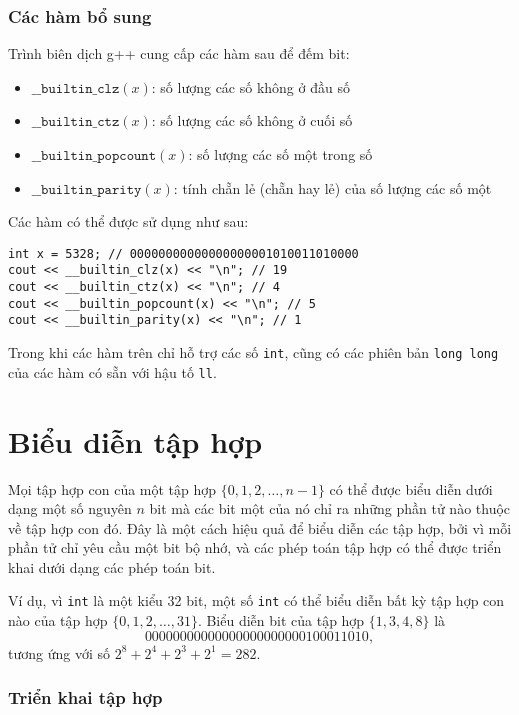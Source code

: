 \subsubsection*{Các hàm bổ sung}

Trình biên dịch g++ cung cấp các
hàm sau để đếm bit:

\begin{itemize}
\item
$\texttt{\_\_builtin\_clz}(x)$:
số lượng các số không ở đầu số
\item
$\texttt{\_\_builtin\_ctz}(x)$:
số lượng các số không ở cuối số
\item
$\texttt{\_\_builtin\_popcount}(x)$:
số lượng các số một trong số
\item
$\texttt{\_\_builtin\_parity}(x)$:
tính chẵn lẻ (chẵn hay lẻ) của số lượng các số một
\end{itemize}
\begin{samepage}

Các hàm có thể được sử dụng như sau:
\begin{lstlisting}
int x = 5328; // 00000000000000000001010011010000
cout << __builtin_clz(x) << "\n"; // 19
cout << __builtin_ctz(x) << "\n"; // 4
cout << __builtin_popcount(x) << "\n"; // 5
cout << __builtin_parity(x) << "\n"; // 1
\end{lstlisting}
\end{samepage}

Trong khi các hàm trên chỉ hỗ trợ các số \texttt{int},
cũng có các phiên bản \texttt{long long} của
các hàm có sẵn với hậu tố \texttt{ll}.

\section{Biểu diễn tập hợp}

Mọi tập hợp con của một tập hợp
$\{0,1,2,\ldots,n-1\}$
có thể được biểu diễn dưới dạng một số nguyên $n$ bit
mà các bit một của nó chỉ ra những
phần tử nào thuộc về tập hợp con đó.
Đây là một cách hiệu quả để biểu diễn các tập hợp,
bởi vì mỗi phần tử chỉ yêu cầu một bit bộ nhớ,
và các phép toán tập hợp có thể được triển khai dưới dạng các phép toán bit.

Ví dụ, vì \texttt{int} là một kiểu 32 bit,
một số \texttt{int} có thể biểu diễn bất kỳ tập hợp con nào
của tập hợp $\{0,1,2,\ldots,31\}$.
Biểu diễn bit của tập hợp $\{1,3,4,8\}$ là
\[00000000000000000000000100011010,\]
tương ứng với số $2^8+2^4+2^3+2^1=282$.

\subsubsection{Triển khai tập hợp}

